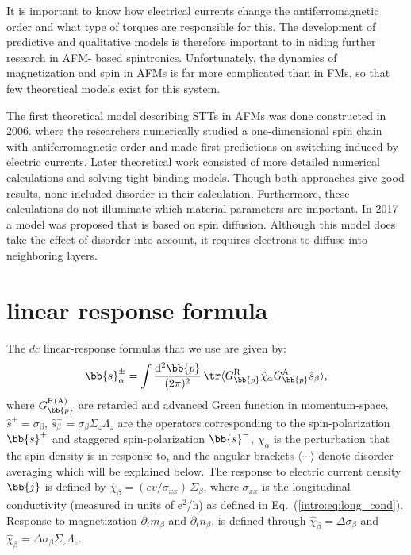 It is important to know how electrical currents change the antiferromagnetic order and what
type of torques are responsible for this. The development of predictive and qualitative models is therefore important to in aiding further research in AFM- based spintronics.
Unfortunately, the dynamics of magnetization and spin in AFMs is far more complicated
than in FMs, so that few theoretical models exist for this system.

The first theoretical model describing STTs in AFMs was done constructed in 2006. where
the researchers numerically studied a one-dimensional spin chain with antiferromagnetic
order and made first predictions on switching induced by electric currents. Later
theoretical work consisted of more detailed numerical calculations and solving tight binding
models. Though both approaches give good results, none included disorder in their
calculation. Furthermore, these calculations do not illuminate which material
parameters are important. In 2017 a model was proposed that is based on spin
diffusion. Although this model does take the effect of disorder into account, it requires
electrons to diffuse into neighboring layers. 

\section{linear response formula}
The $dc$ linear-response formulas that we use are given by:
\begin{align}
    \bb{s}^\pm_\alpha = \int\frac{\mathrm{d}^2\bb{p}}{(2\pi)^2}\,\tr \langle G_{\bb{p}}^\text{R} \hat{{\chi}}_\alpha G_{\bb{p}}^\text{A} \hat{s}_\beta\rangle ,
\end{align}
where $G_{\bb{p}}^\text{R(A)}$ are retarded and advanced Green function in momentum-space, $\hat{s}^+ = \sigma_\beta$, $\hat{s}_\beta^-=\sigma_\beta\Sigma_z \Lambda_z$ are the operators corresponding to the spin-polarization $\bb{s}^+$ and staggered spin-polarization $\bb{s}^-$, $\hat{\chi}_\alpha$ is the perturbation that the spin-density is in response to, and the angular brackets $\langle\cdots\rangle$ denote disorder-averaging which will be explained below. The response to electric current density $\bb{j}$ is defined by $\hat{\chi}_\beta = (e v /\sigma_{xx})\, \Sigma_\beta$, where $\sigma_{xx}$ is the longitudinal conductivity (measured in units of e$^2$/h) as defined in Eq.~(\ref{intro:eq:long_cond}). Response to magnetization $\partial_t m_\beta$ and $\partial_t n_\beta$, is defined through $\hat{\chi}_\beta = \Delta \sigma_\beta$ and $\hat{\chi}_\beta = \Delta \sigma_\beta \Sigma_z\Lambda_z$. 

